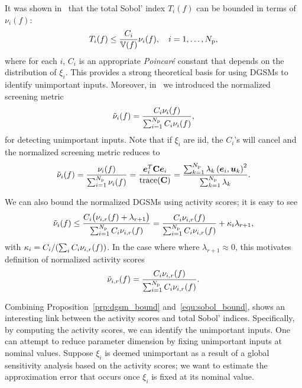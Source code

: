 It was shown in~\cite{Lamboni:2013} that the total Sobol' 
index $T_i(f)$ can be bounded in terms of $\nu_i(f)$:
\begin{equation}\label{equ:sobol_bound}
T_i(f) \leq \frac{C_i}{\V(f)}\nu_i(f), \quad i = 1, \ldots, \Np,
\end{equation}
where for each $i$, $C_i$ is an appropriate \emph{Poincar\'{e}} constant
that depends on the distribution of $\xi_i$.
This provides a strong theoretical basis for using DGSMs to identify 
unimportant inputs. Moreover, 
in~\cite{Vohra:2018} we introduced the normalized screening metric
\[
   \tilde{\nu}_i(f) = \frac{C_i \nu_i(f)}{\sum_{i=1}^\Np C_i \nu_i(f)},
\]
for detecting unimportant inputs. 
Note that if $\xi_i$ are iid, the $C_i$'s will cancel and the normalized screening
metric reduces to 
\[
    \tilde{\nu}_i(f) = \frac{\nu_i(f)}{\sum_{i=1}^\Np \nu_i(f)} 
      = \frac{\vec{e}_i^T \mat{C} \vec{e}_i}{\trace(\mat{C})} 
      = \frac{\sum_{k=1}^\Np \lambda_k \ip{\vec{e}_i}{\vec{u}_k}^2}{\sum_{k = 1}^\Np \lambda_k}.
\]

We can also bound the normalized DGSMs using activity scores; it is easy to see  
\[
\tilde{\nu}_i(f) \leq 
\frac{ C_i \big(\act{f}{i}{r} + \lambda_{r+1}\big)}{\sum_{i=1}^\Np C_i \act{f}{i}{r}}
=\frac{C_i \act{f}{i}{r}}{\sum_{i=1}^\Np C_i \act{f}{i}{r}} + \kappa_i \lambda_{r+1}, 
\]
with $\kappa_i = C_i / (\sum_i C_i \act{f}{i}{r})$. 
In the case where where $\lambda_{r+1} \approx 0$, 
this motivates definition of
normalized activity scores
\[
   \actt{f}{i}{r} =  \frac{C_i \act{f}{i}{r}}{\sum_{i=1}^\Np C_i \act{f}{i}{r}}.
\] 

Combining Proposition~\ref{prp:dgsm_bound} and~\eqref{equ:sobol_bound}, shows
an interesting link between the activity scores and total Sobol' indices.
Specifically, by computing the activity scores, we can identify the unimportant
inputs.  
One can attempt to reduce parameter dimension by fixing
unimportant inputs at nominal values. Suppose $\xi_i$ is
deemed unimportant as a result of a global sensitivity analysis
based on the activity scores; we want to estimate
the approximation error that occurs once $\xi_i$ 
is fixed at its nominal value.


